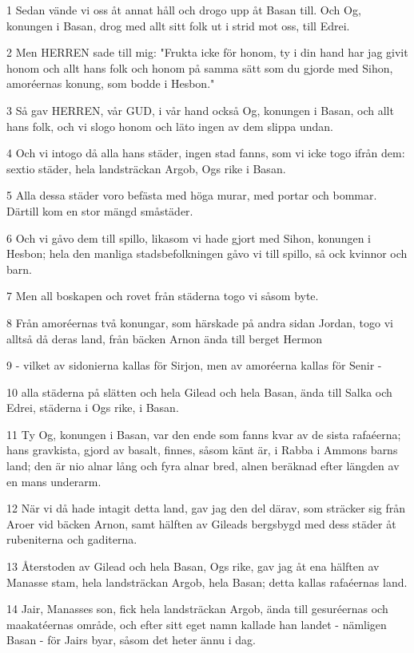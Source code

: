 \par 1 Sedan vände vi oss åt annat håll och drogo upp åt Basan till. Och Og, konungen i Basan, drog med allt sitt folk ut i strid mot oss, till Edrei.
\par 2 Men HERREN sade till mig: "Frukta icke för honom, ty i din hand har jag givit honom och allt hans folk och honom på samma sätt som du gjorde med Sihon, amoréernas konung, som bodde i Hesbon."
\par 3 Så gav HERREN, vår GUD, i vår hand också Og, konungen i Basan, och allt hans folk, och vi slogo honom och läto ingen av dem slippa undan.
\par 4 Och vi intogo då alla hans städer, ingen stad fanns, som vi icke togo ifrån dem: sextio städer, hela landsträckan Argob, Ogs rike i Basan.
\par 5 Alla dessa städer voro befästa med höga murar, med portar och bommar. Därtill kom en stor mängd småstäder.
\par 6 Och vi gåvo dem till spillo, likasom vi hade gjort med Sihon, konungen i Hesbon; hela den manliga stadsbefolkningen gåvo vi till spillo, så ock kvinnor och barn.
\par 7 Men all boskapen och rovet från städerna togo vi såsom byte.
\par 8 Från amoréernas två konungar, som härskade på andra sidan Jordan, togo vi alltså då deras land, från bäcken Arnon ända till berget Hermon
\par 9 - vilket av sidonierna kallas för Sirjon, men av amoréerna kallas för Senir -
\par 10 alla städerna på slätten och hela Gilead och hela Basan, ända till Salka och Edrei, städerna i Ogs rike, i Basan.
\par 11 Ty Og, konungen i Basan, var den ende som fanns kvar av de sista rafaéerna; hans gravkista, gjord av basalt, finnes, såsom känt är, i Rabba i Ammons barns land; den är nio alnar lång och fyra alnar bred, alnen beräknad efter längden av en mans underarm.
\par 12 När vi då hade intagit detta land, gav jag den del därav, som sträcker sig från Aroer vid bäcken Arnon, samt hälften av Gileads bergsbygd med dess städer åt rubeniterna och gaditerna.
\par 13 Återstoden av Gilead och hela Basan, Ogs rike, gav jag åt ena hälften av Manasse stam, hela landsträckan Argob, hela Basan; detta kallas rafaéernas land.
\par 14 Jair, Manasses son, fick hela landsträckan Argob, ända till gesuréernas och maakatéernas område, och efter sitt eget namn kallade han landet - nämligen Basan - för Jairs byar, såsom det heter ännu i dag.
